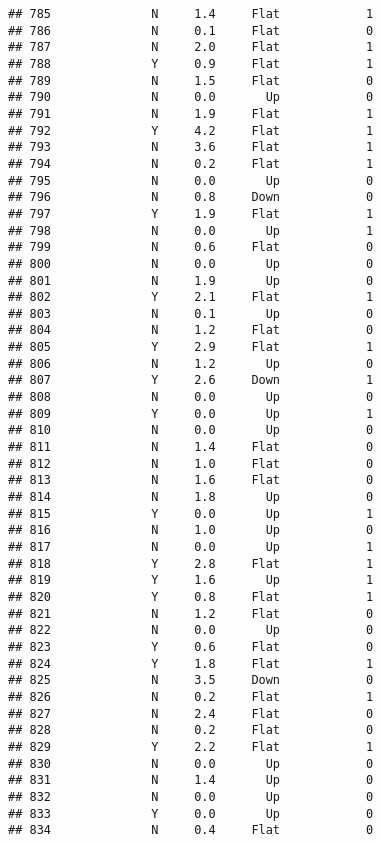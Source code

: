 \documentclass[
]{article}
\begin{document}
\begin{verbatim}
## 785              N     1.4     Flat            1
## 786              N     0.1     Flat            0
## 787              N     2.0     Flat            1
## 788              Y     0.9     Flat            1
## 789              N     1.5     Flat            0
## 790              N     0.0       Up            0
## 791              N     1.9     Flat            1
## 792              Y     4.2     Flat            1
## 793              N     3.6     Flat            1
## 794              N     0.2     Flat            1
## 795              N     0.0       Up            0
## 796              N     0.8     Down            0
## 797              Y     1.9     Flat            1
## 798              N     0.0       Up            1
## 799              N     0.6     Flat            0
## 800              N     0.0       Up            0
## 801              N     1.9       Up            0
## 802              Y     2.1     Flat            1
## 803              N     0.1       Up            0
## 804              N     1.2     Flat            0
## 805              Y     2.9     Flat            1
## 806              N     1.2       Up            0
## 807              Y     2.6     Down            1
## 808              N     0.0       Up            0
## 809              Y     0.0       Up            1
## 810              N     0.0       Up            0
## 811              N     1.4     Flat            0
## 812              N     1.0     Flat            0
## 813              N     1.6     Flat            0
## 814              N     1.8       Up            0
## 815              Y     0.0       Up            1
## 816              N     1.0       Up            0
## 817              N     0.0       Up            1
## 818              Y     2.8     Flat            1
## 819              Y     1.6       Up            1
## 820              Y     0.8     Flat            1
## 821              N     1.2     Flat            0
## 822              N     0.0       Up            0
## 823              Y     0.6     Flat            0
## 824              Y     1.8     Flat            1
## 825              N     3.5     Down            0
## 826              N     0.2     Flat            1
## 827              N     2.4     Flat            0
## 828              N     0.2     Flat            0
## 829              Y     2.2     Flat            1
## 830              N     0.0       Up            0
## 831              N     1.4       Up            0
## 832              N     0.0       Up            0
## 833              Y     0.0       Up            0
## 834              N     0.4     Flat            0

\end{verbatim}
\end{document}
